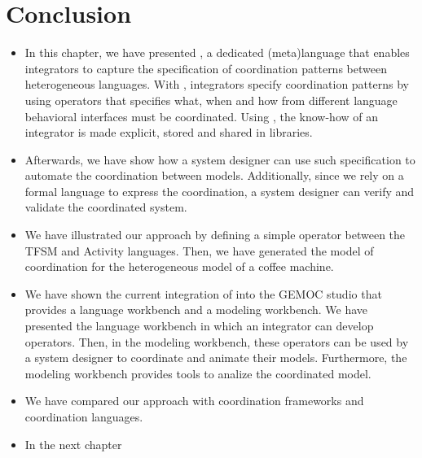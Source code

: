 \section{Conclusion}
\begin{itemize}
	
	\item In this chapter, we have presented \bcool, a dedicated (meta)language that enables integrators to capture the specification of coordination patterns between heterogeneous languages. With \bcool, integrators specify coordination patterns by using operators that specifies what, when and how \dse from different language behavioral interfaces must be coordinated. Using \bcool, the know-how of an integrator is made explicit, stored and shared in libraries.

	\item Afterwards, we have show how a system designer can use such specification to automate the coordination between models. Additionally, since we rely on a formal language to express the coordination, a system designer can verify and validate the coordinated system.  
	
	\item We have illustrated our approach by defining a simple operator between the TFSM and Activity languages. Then, we have generated the model of coordination for the heterogeneous model of a coffee machine. 
	
	\item We have shown the current integration of \bcool into the GEMOC studio that provides a language workbench and a modeling workbench. We have presented the language workbench in which an integrator can develop \bcool operators. Then, in the modeling workbench, these operators can be used by a system designer to coordinate and animate their models. Furthermore, the modeling workbench provides tools to analize the coordinated model.  
	
	\item We have compared our approach with coordination frameworks and coordination languages.    

	\item In the next chapter
\end{itemize}
